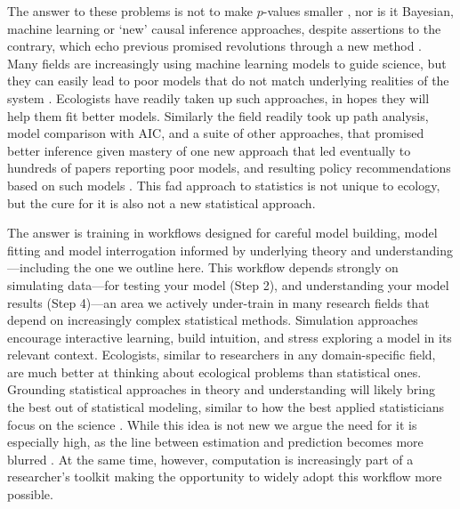 \documentclass[11pt]{article}
\begin{document}
The answer to these problems is not to make $p$-values smaller \citep{halsey2015,colquhoun2017}, nor is it Bayesian, machine learning or `new' causal inference approaches, despite assertions to the contrary, which echo previous promised revolutions through a new method \citep[e.g.,][]{mitchell1992testing,Burnham2004,byrnes2025causal}. %
Many fields are increasingly using machine learning models to guide science, but they can easily lead to poor models that do not match underlying realities of the system \citep{efron2020prediction,pichler2023machine}. Ecologists have readily taken up such approaches, in hopes they will help them fit better models. Similarly the field readily took up path analysis, model comparison with AIC, and a suite of other approaches, that promised better inference given mastery of one new approach that led eventually to hundreds of papers reporting poor models, and resulting policy recommendations based on such models \citep{petraitis1996inferring,leroux2019prevalence}. This fad approach to statistics is not unique to ecology, but the cure for it is also not a new statistical approach.

The answer is training in workflows designed for careful model building, model fitting and model interrogation informed by underlying theory and understanding \citep{betanworkflow,gelman2020bayesian,vandeschoot2021}---including the one we outline here. This workflow depends strongly on simulating data---for testing your model (Step 2), and understanding your model results (Step 4)---an area we actively under-train in many research fields that depend on increasingly complex statistical methods. Simulation approaches encourage interactive learning, build intuition, and stress exploring a model in its relevant context. Ecologists, similar to researchers in any domain-specific field, are much better at thinking about ecological problems than statistical ones. Grounding statistical approaches in theory and understanding will likely bring the best out of statistical modeling, similar to how the best applied statisticians focus on the science \citep{regotherstories}. While this idea is not new we argue the need for it is especially high, as the line between estimation and prediction becomes more blurred \citep{shmueli2010explain}. At the same time, however, computation is increasingly part of a researcher's toolkit making the opportunity to widely adopt this workflow more possible. 
\end{document}
